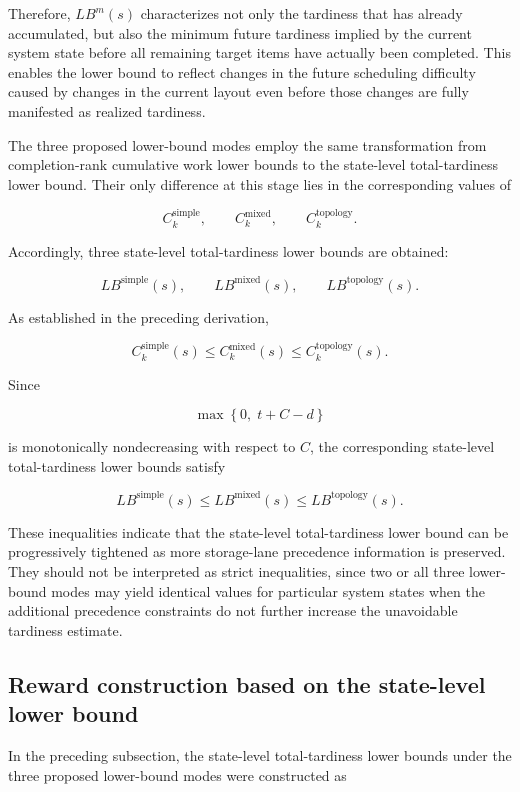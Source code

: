 Therefore, \(LB^m(s)\) characterizes not only the tardiness that has already
accumulated, but also the minimum future tardiness implied by the current
system state before all remaining target items have actually been completed.
This enables the lower bound to reflect changes in the future scheduling
difficulty caused by changes in the current layout even before those changes
are fully manifested as realized tardiness.

The three proposed lower-bound modes employ the same transformation from
completion-rank cumulative work lower bounds to the state-level total-tardiness
lower bound. Their only difference at this stage lies in the corresponding
values of

\[
C_k^{\mathrm{simple}},
\qquad
C_k^{\mathrm{mixed}},
\qquad
C_k^{\mathrm{topology}}.
\]

Accordingly, three state-level total-tardiness lower bounds are obtained:

\[
LB^{\mathrm{simple}}(s),
\qquad
LB^{\mathrm{mixed}}(s),
\qquad
LB^{\mathrm{topology}}(s).
\]

As established in the preceding derivation,

\[
C_k^{\mathrm{simple}}(s)
\leq
C_k^{\mathrm{mixed}}(s)
\leq
C_k^{\mathrm{topology}}(s).
\]

Since

\[
\max
\left\{
0,\;
t+C-d
\right\}
\]

is monotonically nondecreasing with respect to \(C\), the corresponding
state-level total-tardiness lower bounds satisfy

\[
LB^{\mathrm{simple}}(s)
\leq
LB^{\mathrm{mixed}}(s)
\leq
LB^{\mathrm{topology}}(s).
\]

These inequalities indicate that the state-level total-tardiness lower bound
can be progressively tightened as more storage-lane precedence information is
preserved. They should not be interpreted as strict inequalities, since two or
all three lower-bound modes may yield identical values for particular system
states when the additional precedence constraints do not further increase the
unavoidable tardiness estimate.

\subsection{Reward construction based on the state-level lower bound}

In the preceding subsection, the state-level total-tardiness lower bounds under
the three proposed lower-bound modes were constructed as

